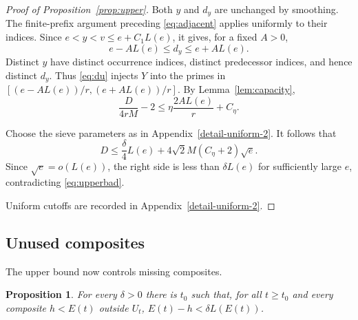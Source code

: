 \documentclass[11pt]{article}
\newtheorem{proposition}[theorem]{Proposition}
\theoremstyle{remark}
\newcommand{\U}{U}
\begin{document}
\begin{proof}[Proof of Proposition~\ref{prop:upper}]
Both $y$ and $d_y$ are unchanged by smoothing.
The finite-prefix argument preceding \eqref{eq:adjacent} applies
uniformly to their indices. Since
$e<y<v\leq e+C_1L(e)$, it gives, for a fixed $A>0$,
\[
 e-AL(e)\leq d_y\leq e+AL(e).
\]
Distinct $y$ have distinct occurrence indices, distinct predecessor
indices, and hence distinct $d_y$. Thus \eqref{eq:du} injects $Y$
into the primes in
$[(e-AL(e))/r,(e+AL(e))/r]$.
By Lemma~\ref{lem:capacity},
\[
 \frac{D}{4rM}-2\leq\eta\frac{2AL(e)}r+C_\eta.
\]
\par\noindent Choose the sieve parameters as in Appendix~\ref{detail-uniform-2}.
It follows that
\[
 D\leq\frac\delta4 L(e)+4\sqrt2 M(C_\eta+2)\sqrt e.
\]
Since $\sqrt e=o(L(e))$, the right side is less than
$\delta L(e)$ for sufficiently large $e$, contradicting
\eqref{eq:upperbad}. %

\par\noindent Uniform cutoffs are recorded in Appendix~\ref{detail-uniform-2}.
\end{proof}

\subsection*{Unused composites}\label{sec:lower}
The upper bound now controls missing composites.

\begin{proposition}\label{prop:lower}
For every $\delta>0$ there is $t_0$ such that, for all $t\geq t_0$
and every composite $h<E(t)$ outside $\U_t$,
$E(t)-h<\delta L(E(t))$.
\end{proposition}
\end{document}
